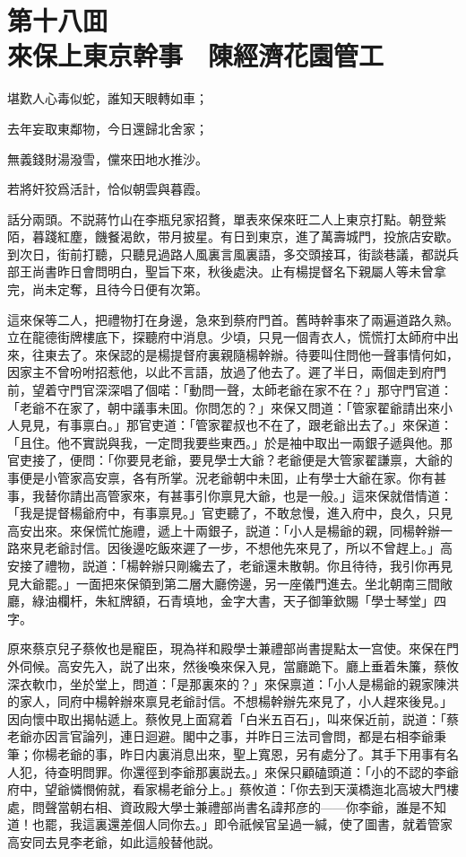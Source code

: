 
\chapter*{第十八囬　\\來保上東京幹事　陳經濟花園管工}


\begin{myquote}
堪歎人心毒似蛇，誰知天眼轉如車；

去年妄取東鄰物，今日還歸北舍家；

無義錢財湯潑雪，儻來田地水推沙。

若將奸狡爲活計，恰似朝雲與暮霞。
\end{myquote}

話分兩頭。不説蔣竹山在李瓶兒家招贅，單表來保來旺二人上東京打點。朝登紫陌，暮踐紅塵，饑餐渴飲，带月披星。有日到東京，進了萬壽城門，投旅店安歇。到次日，街前打聽，只聽見過路人風裏言風裏語，多交頭接耳，街談巷議，都説兵部王尚書昨日會問明白，聖旨下來，秋後處決。止有楊提督名下親屬人等未曾拿完，尚未定奪，且待今日便有次第。

這來保等二人，把禮物打在身邊，急來到蔡府門首。舊時幹事來了兩遍道路久熟。立在龍德街牌樓底下，探聽府中消息。少頃，只見一個青衣人，慌慌打太師府中出來，往東去了。來保認的是楊提督府裏親隨楊幹辦。待要叫住問他一聲事情何如，因家主不曾吩咐招惹他，以此不言語，放過了他去了。遲了半日，兩個走到府門前，望着守門官深深唱了個喏：「動問一聲，太師老爺在家不在？」那守門官道：「老爺不在家了，朝中議事未囬。你問怎的？」來保又問道：「管家翟爺請出來小人見見，有事禀白。」那官吏道：「管家翟叔也不在了，跟老爺出去了。」來保道：「且住。他不實説與我，一定問我要些東西。」於是袖中取出一兩銀子遞與他。那官吏接了，便問：「你要見老爺，要見學士大爺？老爺便是大管家翟謙禀，大爺的事便是小管家高安禀，各有所掌。況老爺朝中未囬，止有學士大爺在家。你有甚事，我替你請出高管家來，有甚事引你禀見大爺，也是一般。」這來保就借情道：「我是提督楊爺府中，有事禀見。」官吏聽了，不敢怠慢，進入府中，良久，只見高安出來。來保慌忙施禮，遞上十兩銀子，説道：「小人是楊爺的親，同楊幹辦一路來見老爺討信。因後邊吃飯來遲了一步，不想他先來見了，所以不曾趕上。」高安接了禮物，説道：「楊幹辦只剛纔去了，老爺還未散朝。你且待待，我引你再見見大爺罷。」一面把來保領到第二層大廳傍邊，另一座儀門進去。坐北朝南三間敞廳，綠油欄杆，朱紅牌額，石青填地，金字大書，天子御筆欽賜「學士琴堂」四字。

原來蔡京兒子蔡攸也是寵臣，現為祥和殿學士兼禮部尚書提點太一宫使。來保在門外伺候。高安先入，説了出來，然後喚來保入見，當廳跪下。廳上垂着朱簾，蔡攸深衣軟巾，坐於堂上，問道：「是那裏來的？」來保禀道：「小人是楊爺的親家陳洪的家人，同府中楊幹辦來禀見老爺討信。不想楊幹辦先來見了，小人趕來後見。」因向懷中取出揭帖遞上。蔡攸見上面寫着「白米五百石」，叫來保近前，説道：「蔡老爺亦因言官論列，連日迴避。閣中之事，并昨日三法司會問，都是右相李爺秉筆；你楊老爺的事，昨日内裏消息出來，聖上寬恩，另有處分了。其手下用事有名人犯，待查明問罪。你還徑到李爺那裏説去。」來保只顧磕頭道：「小的不認的李爺府中，望爺憐憫俯就，看家楊老爺分上。」蔡攸道：「你去到天漢橋迤北高坡大門樓處，問聲當朝右相、資政殿大學士兼禮部尚書名諱邦彦的——你李爺，誰是不知道！也罷，我這裏還差個人同你去。」即令祇候官呈過一緘，使了圖書，就着管家高安同去見李老爺，如此這般替他説。

